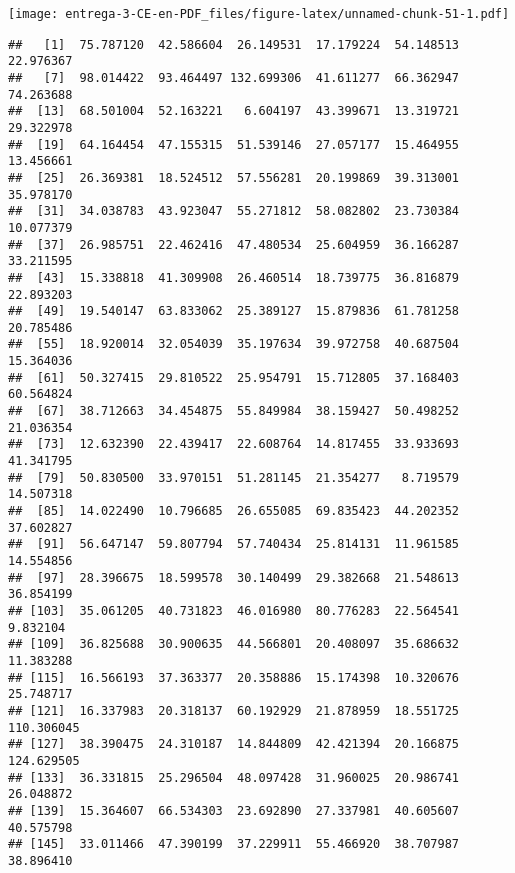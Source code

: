 \documentclass[
]{article}
\newenvironment{Shaded}{\begin{snugshade}}{\end{snugshade}}
\newcommand{\DataTypeTok}[1]{\textcolor[rgb]{0.13,0.29,0.53}{#1}}
\newcommand{\DecValTok}[1]{\textcolor[rgb]{0.00,0.00,0.81}{#1}}
\newcommand{\KeywordTok}[1]{\textcolor[rgb]{0.13,0.29,0.53}{\textbf{#1}}}
\newcommand{\NormalTok}[1]{#1}
\newcommand{\OperatorTok}[1]{\textcolor[rgb]{0.81,0.36,0.00}{\textbf{#1}}}
\newcommand{\StringTok}[1]{\textcolor[rgb]{0.31,0.60,0.02}{#1}}
\begin{document}
\texttt{[image: entrega-3-CE-en-PDF\_files/figure-latex/unnamed-chunk-51-1.pdf]}

\begin{Shaded}
\end{Shaded}

\begin{verbatim}
##   [1]  75.787120  42.586604  26.149531  17.179224  54.148513  22.976367
##   [7]  98.014422  93.464497 132.699306  41.611277  66.362947  74.263688
##  [13]  68.501004  52.163221   6.604197  43.399671  13.319721  29.322978
##  [19]  64.164454  47.155315  51.539146  27.057177  15.464955  13.456661
##  [25]  26.369381  18.524512  57.556281  20.199869  39.313001  35.978170
##  [31]  34.038783  43.923047  55.271812  58.082802  23.730384  10.077379
##  [37]  26.985751  22.462416  47.480534  25.604959  36.166287  33.211595
##  [43]  15.338818  41.309908  26.460514  18.739775  36.816879  22.893203
##  [49]  19.540147  63.833062  25.389127  15.879836  61.781258  20.785486
##  [55]  18.920014  32.054039  35.197634  39.972758  40.687504  15.364036
##  [61]  50.327415  29.810522  25.954791  15.712805  37.168403  60.564824
##  [67]  38.712663  34.454875  55.849984  38.159427  50.498252  21.036354
##  [73]  12.632390  22.439417  22.608764  14.817455  33.933693  41.341795
##  [79]  50.830500  33.970151  51.281145  21.354277   8.719579  14.507318
##  [85]  14.022490  10.796685  26.655085  69.835423  44.202352  37.602827
##  [91]  56.647147  59.807794  57.740434  25.814131  11.961585  14.554856
##  [97]  28.396675  18.599578  30.140499  29.382668  21.548613  36.854199
## [103]  35.061205  40.731823  46.016980  80.776283  22.564541   9.832104
## [109]  36.825688  30.900635  44.566801  20.408097  35.686632  11.383288
## [115]  16.566193  37.363377  20.358886  15.174398  10.320676  25.748717
## [121]  16.337983  20.318137  60.192929  21.878959  18.551725 110.306045
## [127]  38.390475  24.310187  14.844809  42.421394  20.166875 124.629505
## [133]  36.331815  25.296504  48.097428  31.960025  20.986741  26.048872
## [139]  15.364607  66.534303  23.692890  27.337981  40.605607  40.575798
## [145]  33.011466  47.390199  37.229911  55.466920  38.707987  38.896410

\end{verbatim}
\end{document}
